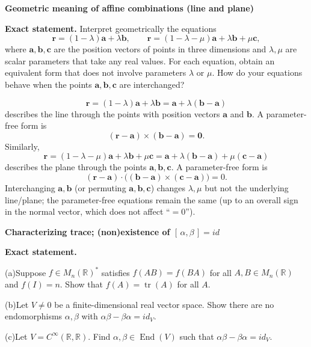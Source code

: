 \begin{problem}[CP-I-0097]
\label{prob:cp-i-0097}
\textbf{Geometric meaning of affine combinations (line and plane)}

\textbf{Exact statement.}
\hspace*{1.5em}Interpret geometrically the equations
\[
\mathbf r=(1-\lambda)\mathbf a+\lambda \mathbf b,
\qquad
\mathbf r=(1-\lambda-\mu)\mathbf a+\lambda \mathbf b+\mu \mathbf c,
\]
where \(\mathbf a,\mathbf b,\mathbf c\) are the position vectors of points in three dimensions and \(\lambda,\mu\) are scalar parameters
that take any real values. For each equation, obtain an equivalent form that does not involve parameters \(\lambda\) or \(\mu\).
How do your equations behave when the points \(\mathbf a,\mathbf b,\mathbf c\) are interchanged?

\end{problem}

\begin{solution}
\[
\mathbf r=(1-\lambda)\mathbf a+\lambda \mathbf b=\mathbf a+\lambda(\mathbf b-\mathbf a)
\]
describes the line through the points with position vectors \(\mathbf a\) and \(\mathbf b\).
A parameter-free form is
\[
(\mathbf r-\mathbf a)\times(\mathbf b-\mathbf a)=\mathbf 0.
\]
Similarly,
\[
\mathbf r=(1-\lambda-\mu)\mathbf a+\lambda \mathbf b+\mu \mathbf c
=\mathbf a+\lambda(\mathbf b-\mathbf a)+\mu(\mathbf c-\mathbf a)
\]
describes the plane through the points \(\mathbf a,\mathbf b,\mathbf c\).
A parameter-free form is
\[
(\mathbf r-\mathbf a)\cdot\bigl((\mathbf b-\mathbf a)\times(\mathbf c-\mathbf a)\bigr)=0.
\]
Interchanging \(\mathbf a,\mathbf b\) (or permuting \(\mathbf a,\mathbf b,\mathbf c\)) changes \(\lambda,\mu\) but not the underlying
line/plane; the parameter-free equations remain the same (up to an overall sign in the normal vector, which does not affect ``\(=0\)'').
\end{solution}

\begin{problem}[CP-I-0099]
\label{prob:cp-i-0099}
\textbf{Characterizing trace; (non)existence of \([\,\alpha,\beta\,]=id\)}

\textbf{Exact statement.}

	\par\hspace*{1.5em} (a)\quad Suppose \(f\in M_n(\mathbb R)^*\) satisfies \(f(AB)=f(BA)\) for all \(A,B\in M_n(\mathbb R)\) and \(f(I)=n\).
	Show that \(f(A)=\operatorname{tr}(A)\) for all \(A\).
	\par\noindent (b)\quad Let \(V\neq0\) be a finite-dimensional real vector space. Show there are no endomorphisms \(\alpha,\beta\) with
	\(\alpha\beta-\beta\alpha=id_V\).
	\par\noindent (c)\quad Let \(V=C^\infty(\mathbb R,\mathbb R)\). Find \(\alpha,\beta\in\operatorname{End}(V)\) such that
	\(\alpha\beta-\beta\alpha=id_V\).

\end{problem}

